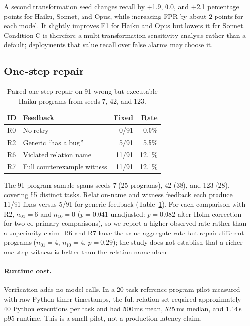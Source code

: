 \documentclass{article}
\newcommand{\tabref}[1]{Table~\ref{#1}}
\begin{document}
A second transformation seed changes recall by +1.9, 0.0, and +2.1 percentage points for Haiku, Sonnet, and Opus, while increasing FPR by about 2 points for each model. It slightly improves F1 for Haiku and Opus but lowers it for Sonnet. Condition C is therefore a multi-transformation sensitivity analysis rather than a default; deployments that value recall over false alarms may choose it.

\subsection{One-step repair}

\begin{table}[t]
\centering
\caption{Paired one-step repair on 91 wrong-but-executable Haiku programs from seeds 7, 42, and 123.}
\label{tab:repair}
\small
\begin{tabular}{llrr}
\toprule
ID & Feedback & Fixed & Rate \\
\midrule
R0 & No retry & 0/91 & 0.0\% \\
R2 & Generic ``has a bug'' & 5/91 & 5.5\% \\
R6 & Violated relation name & 11/91 & 12.1\% \\
R7 & Full counterexample witness & 11/91 & 12.1\% \\
\bottomrule
\end{tabular}
\end{table}

The 91-program sample spans seeds 7 (25 programs), 42 (38), and 123 (28), covering 55 distinct tasks. Relation-name and witness feedback each produce 11/91 fixes versus 5/91 for generic feedback (\tabref{tab:repair}). For each comparison with R2, $n_{01}=6$ and $n_{10}=0$ ($p=0.041$ unadjusted; $p=0.082$ after Holm correction for two co-primary comparisons), so we report a higher observed rate rather than a superiority claim. R6 and R7 have the same aggregate rate but repair different programs ($n_{01}=4$, $n_{10}=4$, $p=0.29$); the study does not establish that a richer one-step witness is better than the relation name alone.

\paragraph{Runtime cost.}
Verification adds no model calls. In a 20-task reference-program pilot measured with raw Python timer timestamps, the full relation set required approximately 40 Python executions per task and had 500\,ms mean, 525\,ms median, and 1.14\,s p95 runtime. This is a small pilot, not a production latency claim.
\end{document}
